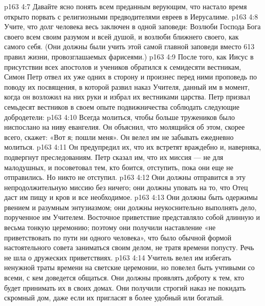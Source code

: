 \vs p163 4:7 \pc {}\bibnobreakspace Давайте ясно понять всем преданным верующим, что настало время открыто порвать с религиозными предводителями евреев в Иерусалиме.
\vs p163 4:8 \pc {}\bibnobreakspace Учите, что долг человека весь заключен в одной заповеди: Возлюби Господа Бога своего всем своим разумом и всей душой, и возлюби ближнего своего, как самого себя. (Они должны были учить этой самой главной заповеди вместо 613 правил жизни, провозглашаемых фарисеями.)
\vs p163 4:9 \pc После того, как Иисус в присутствии всех апостолов и учеников обратился к семидесяти вестникам, Симон Петр отвел их уже одних в сторону и произнес перед ними проповедь по поводу их посвящения, в которой развил наказ Учителя, данный им в момент, когда он возложил на них руки и избрал их вестниками царства. Петр призвал семьдесят вестников в своем опыте подвижничества соблюдать следующие добродетели:
\vs p163 4:10 \bibnobreakspace {} Всегда молиться, чтобы больше тружеников было ниспослано на ниву евангелия. Он объяснил, что молящийся об этом, скорее всего, скажет: «Вот я; пошли меня». Он велел им не забывать ежедневно молиться.
\vs p163 4:11 \pc {}\bibnobreakspace {} Он предупредил их, что их встретят враждебно и, наверняка, подвергнут преследованиям. Петр сказал им, что их миссия --- не для малодушных, и посоветовал тем, кто боится, отступить, пока они еще не отправились. Но никто не отступил.
\vs p163 4:12 \pc {}\bibnobreakspace {} Они должны отправится в эту непродолжительную миссию без ничего; они должны уповать на то, что Отец даст им пищу и кров и все необходимое.
\vs p163 4:13 \pc {}\bibnobreakspace {} Они должны быть одержимы рвением и разумным энтузиазмом; они должны неукоснительно выполнять дело, порученное им Учителем. Восточное приветствие представляло собой длинную и весьма тонкую церемонию; поэтому они получили наставление «не приветствовать по пути ни одного человека», что было обычной формой настоятельного совета заниматься своим делом, не тратя времени попусту. Речь не шла о дружеских приветствиях.
\vs p163 4:14 \pc {}\bibnobreakspace {} Учитель велел им избегать ненужной траты времени на светские церемонии, но повелел быть учтивыми со всеми, с кем доведется общаться. Они должны проявлять доброту к тем, кто будет принимать их в своих домах. Они получили строгий наказ не покидать скромный дом, даже если их пригласят в более удобный или богатый.

